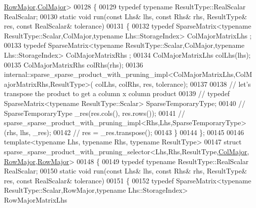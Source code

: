 \begin{DoxyCode}
      \hyperlink{group__enums_ggaacded1a18ae58b0f554751f6cdf9eb13acfcde9cd8677c5f7caf6bd603666aae3}{RowMajor},\hyperlink{group__enums_ggaacded1a18ae58b0f554751f6cdf9eb13a0cbd4bdd0abcfc0224c5fcb5e4f6669a}{ColMajor}>
00128 \{
00129   \textcolor{keyword}{typedef} \textcolor{keyword}{typename} ResultType::RealScalar RealScalar;
00130   \textcolor{keyword}{static} \textcolor{keywordtype}{void} run(\textcolor{keyword}{const} Lhs& lhs, \textcolor{keyword}{const} Rhs& rhs, ResultType& res, \textcolor{keyword}{const} RealScalar& tolerance)
00131   \{
00132     \textcolor{keyword}{typedef} SparseMatrix<typename ResultType::Scalar,ColMajor,typename Lhs::StorageIndex> ColMajorMatrixLhs
      ;
00133     \textcolor{keyword}{typedef} SparseMatrix<typename ResultType::Scalar,ColMajor,typename Lhs::StorageIndex> ColMajorMatrixRhs
      ;
00134     ColMajorMatrixLhs colLhs(lhs);
00135     ColMajorMatrixRhs colRhs(rhs);
00136     internal::sparse\_sparse\_product\_with\_pruning\_impl<ColMajorMatrixLhs,ColMajorMatrixRhs,ResultType>(
      colLhs, colRhs, res, tolerance);
00137 
00138     \textcolor{comment}{// let's transpose the product to get a column x column product}
00139 \textcolor{comment}{//     typedef SparseMatrix<typename ResultType::Scalar> SparseTemporaryType;}
00140 \textcolor{comment}{//     SparseTemporaryType \_res(res.cols(), res.rows());}
00141 \textcolor{comment}{//     sparse\_sparse\_product\_with\_pruning\_impl<Rhs,Lhs,SparseTemporaryType>(rhs, lhs, \_res);}
00142 \textcolor{comment}{//     res = \_res.transpose();}
00143   \}
00144 \};
00145 
00146 \textcolor{keyword}{template}<\textcolor{keyword}{typename} Lhs, \textcolor{keyword}{typename} Rhs, \textcolor{keyword}{typename} ResultType>
00147 \textcolor{keyword}{struct }sparse\_sparse\_product\_with\_pruning\_selector<Lhs,Rhs,ResultType,\hyperlink{group__enums_ggaacded1a18ae58b0f554751f6cdf9eb13a0cbd4bdd0abcfc0224c5fcb5e4f6669a}{ColMajor},
      \hyperlink{group__enums_ggaacded1a18ae58b0f554751f6cdf9eb13acfcde9cd8677c5f7caf6bd603666aae3}{RowMajor},\hyperlink{group__enums_ggaacded1a18ae58b0f554751f6cdf9eb13acfcde9cd8677c5f7caf6bd603666aae3}{RowMajor}>
00148 \{
00149   \textcolor{keyword}{typedef} \textcolor{keyword}{typename} ResultType::RealScalar RealScalar;
00150   \textcolor{keyword}{static} \textcolor{keywordtype}{void} run(\textcolor{keyword}{const} Lhs& lhs, \textcolor{keyword}{const} Rhs& rhs, ResultType& res, \textcolor{keyword}{const} RealScalar& tolerance)
00151   \{
00152     \textcolor{keyword}{typedef} SparseMatrix<typename ResultType::Scalar,RowMajor,typename Lhs::StorageIndex> RowMajorMatrixLhs

\end{DoxyCode}
